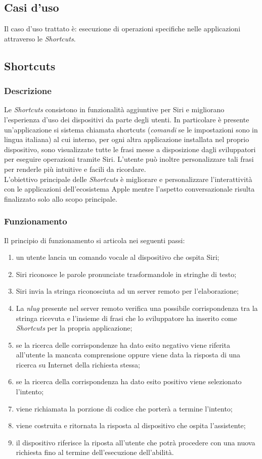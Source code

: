	\subsection{Casi d'uso}
	Il caso d'uso trattato è: esecuzione di operazioni specifiche nelle applicazioni attraverso le \emph{Shortcuts}.
	\subsection{Shortcuts}
		\subsubsection{Descrizione}
		Le \emph{Shortcuts} consistono in funzionalità aggiuntive per Siri e migliorano l'esperienza d'uso dei dispositivi da parte degli utenti. In particolare è presente un'applicazione si sistema chiamata shortcuts (\emph{comandi} se le impostazioni sono in lingua italiana) al cui interno, per ogni altra applicazione installata nel proprio dispositivo, sono visualizzate tutte le frasi messe a disposizione dagli sviluppatori per eseguire operazioni tramite Siri. L'utente può inoltre personalizzare tali frasi per renderle più intuitive e facili da ricordare. \\
		L'obiettivo principale delle \emph{Shortcuts} è migliorare e personalizzare l'interattività con le applicazioni dell'ecosistema Apple mentre l'aspetto conversazionale risulta finalizzato solo allo scopo principale.
		\subsubsection{Funzionamento}
		Il principio di funzionamento si articola nei seguenti passi:
		\begin{enumerate}
			\item un utente lancia un comando vocale al dispositivo che ospita Siri;
			\item Siri riconosce le parole pronunciate trasformandole in stringhe di testo;
			\item Siri invia la stringa riconosciuta ad un server remoto per l'elaborazione;
			\item La \emph{\gls{nlug}} presente nel server remoto verifica una possibile corrispondenza tra la stringa ricevuta e l'insieme di frasi che lo sviluppatore ha inserito come \emph{Shortcuts} per la propria applicazione;
			\item se la ricerca delle corrispondenze ha dato esito negativo viene riferita all'utente la mancata comprensione oppure viene data la risposta di una ricerca su Internet della richiesta stessa;
			\item se la ricerca della corrispondenza ha dato esito positivo viene selezionato l'intento;
			\item viene richiamata la porzione di codice che porterà a termine l'intento;
			\item viene costruita e ritornata la risposta al dispositivo che ospita l'assistente;
			\item il dispositivo riferisce la riposta all'utente che potrà procedere con una nuova richiesta fino al termine dell'esecuzione dell'abilità.
		\end{enumerate}
